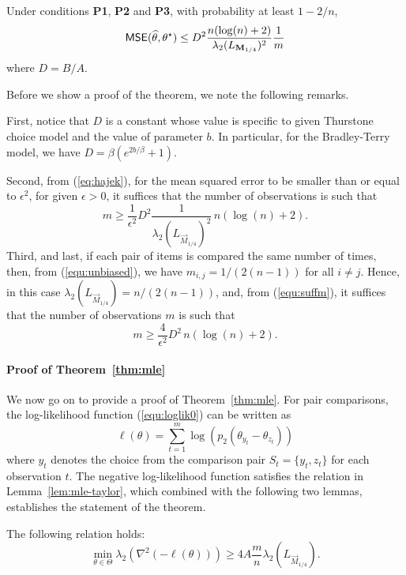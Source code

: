 \begin{theorem} Under conditions {\bf P1}, {\bf P2} and {\bf P3}, with probability at least $1-2/n$, 
\begin{equation}
\hbox{\textup{\textsf{MSE}}}(\widehat{\theta},\theta^\star) \le D^2\frac{n(\log(n)+2)}{\lambda_{2}(L_{\mathbf{M}_{1/4}})^2}\frac{1}{m}
\label{eq:hajek}
\end{equation}
where $D = B/A$.
\label{thm:mle}
\end{theorem}

Before we show a proof of the theorem, we note the following remarks. 

First, notice that $D$ is a constant whose value is specific to given Thurstone choice model and the value of parameter $b$. In particular, for the Bradley-Terry model, we have $D = \beta(e^{2b/\beta} + 1)$.

Second, from (\ref{eq:hajek}), for the mean squared error to be smaller than or equal to $\epsilon^2$, for given $\epsilon > 0$, it suffices that the number of observations is such that  
\begin{equation}
m \geq \frac{1}{\epsilon^2} D^2 \frac{1}{\lambda_2(L_{\vec{M}_{1/4}})^2}\, n(\log(n)+2).
\label{equ:suffm}
\end{equation}
Third, and last, if each pair of items is compared the same number of times, then, from (\ref{equ:unbiased}), we have $m_{i,j} = 1/(2(n-1))$ for all $i\neq j$. Hence, in this case $\lambda_2(L_{\vec{M}_{1/4}}) = n/(2(n-1))$, and, from (\ref{equ:suffm}), it suffices that the number of observations $m$ is such that 
$$
m \geq \frac{4}{\epsilon^2} D^2\, n(\log(n)+2).
$$ 

\paragraph{Proof of Theorem~\ref{thm:mle}} We now go on to provide a proof of Theorem~\ref{thm:mle}. For pair comparisons, the log-likelihood function (\ref{equ:loglik0}) can be written as
$$
\ell(\theta) = \sum_{t=1}^m \log(p_2(\theta_{y_t}-\theta_{z_t}))
$$
where $y_t$ denotes the choice from the comparison pair $S_t = \{y_t,z_t\}$ for each observation $t$. The negative log-likelihood function satisfies the relation in Lemma~\ref{lem:mle-taylor}, which combined with the following two lemmas, establishes the statement of the theorem.

\begin{lemma} The following relation holds:
$$
\min_{\theta\in \Theta}\lambda_2(\nabla^2(-\ell(\theta))) \geq 4 A\frac{m}{n}\lambda_2(L_{\vec{M}_{1/4}}).
$$
\label{lem:LT21}
\end{lemma}

